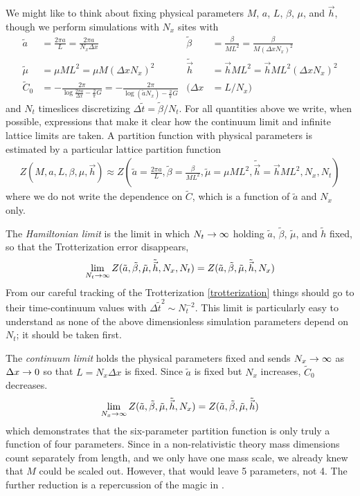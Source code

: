 We might like to think about fixing physical parameters $M$, $a$, $L$, $\beta$, $\mu$, and $\vec{h}$, though we perform simulations with $N_x$ sites with
\begin{align}
    \tilde{a} &= \frac{2\pi a}{L} = \frac{2\pi a}{N_x \Delta x}
    &
    \tilde{\beta} &= \frac{\beta}{M L^2} = \frac{\beta}{M(\Delta x N_x)^2}
    \nonumber\\
    \tilde{\mu} &= \mu M L^2 = \mu M (\Delta x N_x)^2
    &
    \tilde{\vec{h}} &= \vec{h} M L^2 = \vec{h} ML^2 (\Delta x N_x)^2
    \\\nonumber
    \tilde{C}_0 &
        = - \frac{2\pi}{\log \frac{2\pi a}{\Delta x} - \frac{2}{\pi} G}
        = - \frac{2\pi}{\log (\tilde{a} N_x) - \frac{2}{\pi} G}
    &
    (\Delta x &= L/N_x)
\end{align}
and $N_t$ timeslices discretizing $\Delta\tilde{t} = \tilde{\beta}/N_t$.
For all quantities above we write, when possible, expressions that make it clear how the continuum limit and infinite lattice limits are taken.
A partition function with physical parameters is estimated by a particular lattice partition function
\begin{align}
    Z\left(M, a, L, \beta, \mu, \vec{h}\right) \approx Z\left(\tilde{a} = \frac{2\pi a}{L}, \tilde{\beta} = \frac{\beta}{ML^2}, \tilde{\mu} = \mu ML^2, \tilde{\vec{h}} = \vec{h}ML^2, N_x, N_t \right)
\end{align}
where we do not write the dependence on $\tilde{C}$, which is a function of $\tilde{a}$ and $N_x$ only.

The \emph{Hamiltonian limit} is the limit in which $N_t\rightarrow\infty$ holding $\tilde{a}$, $\tilde{\beta}$, $\tilde{\mu}$, and $\tilde{h}$ fixed, so that the Trotterization error disappears,
\begin{align}
    \lim_{N_t\rightarrow\infty} Z(\tilde{a}, \tilde{\beta}, \tilde{\mu}, \tilde{\vec{h}}, N_x, N_t)
    =
    Z(\tilde{a}, \tilde{\beta}, \tilde{\mu}, \tilde{\vec{h}}, N_x)
    \label{eq:hamiltonian limit}
\end{align}
From our careful tracking of the Trotterization \eqref{trotterization} things should go to their time-continuum values with $\Delta{\tilde{t}}^2 \sim N_t^{-2}$.
This limit is particularly easy to understand as none of the above dimensionless simulation parameters depend on $N_t$; it should be taken first.

The \emph{continuum limit} holds the physical parameters fixed and sends $N_x \rightarrow \infty$ as $\Delta x\rightarrow 0$ so that $L=N_x \Delta x$ is fixed.
Since $\tilde{a}$ is fixed but $N_x$ increases, $\tilde{C}_0$ decreases.
\begin{align}
    \lim_{N_x\rightarrow\infty} Z(\tilde{a}, \tilde{\beta}, \tilde{\mu}, \tilde{\vec{h}}, N_x) = Z(\tilde{a}, \tilde{\beta}, \tilde{\mu}, \tilde{\vec{h}})
\end{align}
which demonstrates that the six-parameter partition function is only truly a function of four parameters.
Since in a non-relativistic theory mass dimensions count separately from length, and we only have one mass scale, we already knew that $M$ could be scaled out.
However, that would leave 5 parameters, not 4.
The further reduction is a repercussion of the magic in .


